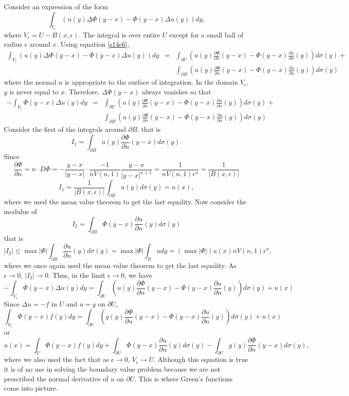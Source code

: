 \documentclass{article}
\newcommand{\pd}[2]{\frac{\partial{#1}}{\partial{#2}}}
\theoremstyle{plain}
\numberwithin{thm}{section}
\theoremstyle{plain}
\numberwithin{prop}{section}
\theoremstyle{definition}
\numberwithin{defn}{section}
\theoremstyle{remark}
\numberwithin{equation}{section}
\begin{document}
Consider an expression of the form
\[
\int_{V_\epsilon} \left(u(y)\Delta\Phi(y - x) - \Phi(y - x)\Delta u(y)\right)dy,
\]
where $V_\epsilon = U - B(x, \epsilon)$. The integral is over entire $U$ except for a small ball of 
radius $\epsilon$ around $x$. Using equation \eqref{s14e6},
\begin{eqnarray*}
\int_{V_\epsilon} \left(u(y)\Delta\Phi(y - x) - \Phi(y - x)\Delta u(y)\right)dy &=& 
\int_{\partial U} \left(u(y)\pd{\Phi}{n}(y - x) - \Phi(y - x)\pd{u}{n}(y)\right)d\sigma(y) + \\
 & & \int_{\partial B} \left(u(y)\pd{\Phi}{n}(y - x) - \Phi(y - x)\pd{u}{n}(y)\right)d\sigma(y)
\end{eqnarray*}
where the normal $n$ is appropriate to the surface of integration. In the domain $V_\epsilon$, $y$ is never equal 
to $x$. Therefore, $\Delta\Phi(y - x)$ always vanishes so that
\begin{eqnarray*}
-\int_{V_\epsilon} \Phi(y - x)\Delta u(y) dy &=& 
\int_{\partial U} \left(u(y)\pd{\Phi}{n}(y - x) - \Phi(y - x)\pd{u}{n}(y)\right)d\sigma(y) + \\
 & & \int_{\partial B} \left(u(y)\pd{\Phi}{n}(y - x) - \Phi(y - x)\pd{u}{n}(y)\right)d\sigma(y)
\end{eqnarray*}
Consider the first of the integrals around $\partial B$, that is
\[
I_1 = \int_{\partial B} u(y)\pd{\Phi}{n}(y - x)d\sigma(y).
\]
Since
\[
\pd{\Phi}{n} = n\cdot D\Phi = -\frac{y - x}{|y - x|} \cdot \frac{-1}{nV(n, 1)}\frac{y - x}{|y - x|^{n+1}} = 
\frac{1}{nV(n, 1)\epsilon^n} = \frac{1}{|B(x, \epsilon)|}
\]
\[
I_1 = \frac{1}{|B(x, \epsilon)|}\int_{\partial B} u(y)d\sigma(y) = u(x),
\]
where we used the mean value theorem to get the last equality. Now consider the modulus of
\[
I_2 = \int_{\partial B}\Phi(y - x)\pd{u}{n}(y)d\sigma(y)
\]
that is
\[
|I_2| \le \max|\Phi| \int_{\partial B}\pd{u}{n}(y)d\sigma(y) = \max|\Phi|\int_B udy = 
(\max|\Phi|) u(x) nV(n, 1)\epsilon^n,
\]
where we once again used the mean value theorem to get the last equality. As $\epsilon \rightarrow 0$, $|I_2|
\rightarrow 0$. Thus, in the limit $\epsilon \rightarrow 0$, we have
\[
-\int_{V_\epsilon} \Phi(y - x)\Delta u(y) dy = 
\int_{\partial U} \left(u(y)\pd{\Phi}{n}(y - x) - \Phi(y - x)\pd{u}{n}(y)\right)d\sigma(y) + u(x)
\]
Since $\Delta u = -f$ in $U$ and $u = g$ on $\partial U$,
\[
\int_{V_\epsilon} \Phi(y - x)f(y) dy = 
\int_{\partial U} \left(g(y)\pd{\Phi}{n}(y - x) - \Phi(y - x)\pd{u}{n}(y)\right)d\sigma(y) + u(x)
\]
or
\begin{equation}\label{s23e2}
u(x) = \int_U \Phi(y - x)f(y) dy + \int_{\partial U}\Phi(y - x)\pd{u}{n}(y)d\sigma(y)
- \int_{\partial U} g(y)\pd{\Phi}{n}(y - x) d\sigma(y),
\end{equation}
where we also used the fact that as $\epsilon \rightarrow 0$, $V_\epsilon \rightarrow U$. Although this equation 
is true it is of no use in solving the boundary value problem because we are not prescribed the normal derivative
of $u$ on $\partial U$. This is where Green's functions come into picture.
\end{document}
